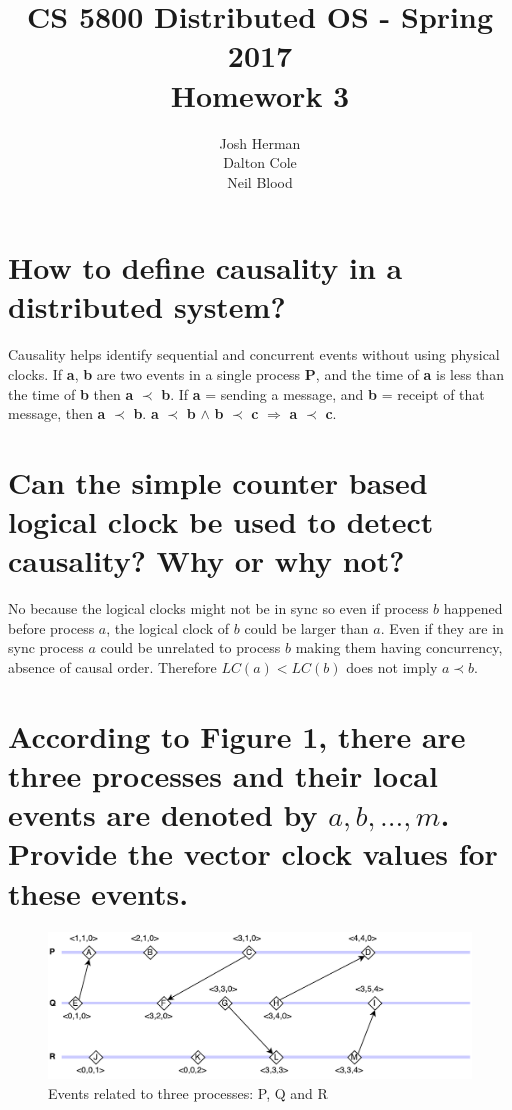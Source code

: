 \documentclass[times]{article}
\begin{document}
	\title{CS 5800 Distributed OS - Spring 2017 \\ Homework 3}
	\author{Josh Herman \\ Dalton Cole \\ Neil Blood}
	\date{}
	\maketitle

	\section{How to define causality in a distributed system?}
		Causality helps identify sequential and concurrent events without using physical clocks. If \textbf{a}, \textbf{b} are two events in a single process \textbf{P}, and the time of \textbf{a} is less than the time of \textbf{b} then \textbf{a} $\prec$ \textbf{b}. If \textbf{a} = sending a message, and \textbf{b} = receipt of that message, then \textbf{a} $\prec$ \textbf{b}. \textbf{a} $\prec$ \textbf{b} $\wedge$ \textbf{b} $\prec$ \textbf{c} $\Rightarrow$ \textbf{a} $\prec$ \textbf{c}.
	
	\section{Can the simple counter based logical clock be used to detect causality? Why or why not?}%
		No because the logical clocks might not be in sync so even if process $b$ happened before process $a$, the logical clock of $b$ could be larger than $a$. Even if they are in sync process $a$ could be unrelated to process $b$ making them having concurrency, absence of causal order. Therefore $LC(a)<LC(b)$ does not imply $a \prec b$.


	\section{According to Figure 1, there are three processes and their local events are denoted by $a, b,...,m$. Provide the vector clock values for these events.}%

	\begin{figure}[H]
		\includegraphics[width=\linewidth]{CS5800HW3.pdf}
		\caption{Events related to three processes: P, Q and R}
	\end{figure}
\end{document}

